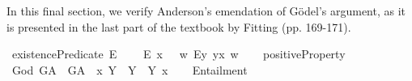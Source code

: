 %
\begin{isabellebody}%
%
%
%
%
%
%
%
%
\isamarkuptrue%
%
\begin{isamarkuptext}%
In this final section, we verify Anderson's emendation of G\"odel's argument, as it is presented in the last
part of the textbook by Fitting (pp. 169-171).%
\end{isamarkuptext}\isamarkuptrue%
%
\isamarkuptrue%
\isamarkupfalse%
\ existencePredicate{\isacharcolon}{\isacharcolon}{\isachardoublequoteopen}{\isasymup}{\isasymlangle}{\isasymzero}{\isasymrangle}{\isachardoublequoteclose}\ {\isacharparenleft}{\isachardoublequoteopen}E{\isacharbang}{\isachardoublequoteclose}{\isacharparenright}\ \isanewline
\ \ \ {\isachardoublequoteopen}E{\isacharbang}\ x\ \ {\isasymequiv}\ {\isasymlambda}w{\isachardot}\ {\isacharparenleft}\isactrlbold {\isasymexists}\isactrlsup Ey{\isachardot}\ y\isactrlbold {\isasymapprox}x{\isacharparenright}\ w{\isachardoublequoteclose}\isanewline
\ \ \isanewline
{}\isamarkupfalse%
\ positiveProperty{\isacharcolon}{\isacharcolon}{\isachardoublequoteopen}{\isasymup}{\isasymlangle}{\isasymup}{\isasymlangle}{\isasymzero}{\isasymrangle}{\isasymrangle}{\isachardoublequoteclose}\ {\isacharparenleft}{\isachardoublequoteopen}{\isasymP}{\isachardoublequoteclose}{\isacharparenright}\isanewline
\ \ \isanewline
{}\isamarkupfalse%
\ God{\isacharcolon}{\isacharcolon}{\isachardoublequoteopen}{\isasymup}{\isasymlangle}{\isasymzero}{\isasymrangle}{\isachardoublequoteclose}\ {\isacharparenleft}{\isachardoublequoteopen}G\isactrlsup A{\isachardoublequoteclose}{\isacharparenright}\ \ {\isachardoublequoteopen}G\isactrlsup A\ {\isasymequiv}\ {\isasymlambda}x{\isachardot}\ \isactrlbold {\isasymforall}Y{\isachardot}\ {\isacharparenleft}{\isasymP}\ Y{\isacharparenright}\ \isactrlbold {\isasymleftrightarrow}\ \isactrlbold {\isasymbox}{\isacharparenleft}Y\ x{\isacharparenright}{\isachardoublequoteclose}\isanewline
\ \ \isanewline
{}\isamarkupfalse%
\ Entailment{\isacharcolon}{\isacharcolon}{\isachardoublequoteopen}{\isasymup}{\isasymlangle}{\isasymup}{\isasymlangle}{\isasymzero}{\isasymrangle}{\isacharcomma}{\isasymup}{\isasymlangle}{\isasymzero}{\isasymrangle}{\isasymrangle}{\isachardoublequoteclose}\ {\isacharparenleft}\ {\isachardoublequoteopen}{\isasymRrightarrow}{\isachardoublequoteclose}\ {}{}{\isacharparenright}\ \isanewline

\end{isabellebody}
